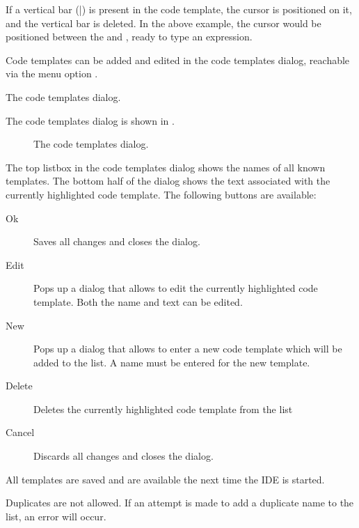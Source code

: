 If a vertical bar (|) is present in the code template, the cursor is positioned
on it, and the vertical bar is deleted. In the above example, the cursor would be
positioned between the  and , ready to type an expression.

Code templates can be added and edited in the code templates dialog, reachable via
the menu option . 

\begin{htmlonly}
The code templates dialog.
\end{htmlonly}
\begin{latexonly}
The code templates dialog is shown in .
\begin{figure}[ht]
\begin{center}
\caption{The code templates dialog.}\label{fig:codetemp}
\ifpdf
{}
\else
{}
\fi
\end{center}
\end{figure}
\end{latexonly}
The top listbox in the code templates dialog shows the names of all 
known templates. The bottom half of the dialog shows the text associated
with the currently highlighted code template.
The following buttons are available:
\begin{description}
\item[Ok] Saves all changes and closes the dialog.
\item[Edit] Pops up a dialog that allows to edit the currently 
highlighted code template. Both the name and text can be edited.
\item[New] Pops up a dialog that allows to enter a new code template
which will be added to the list. A name must be entered for the new
template.
\item[Delete] Deletes the currently highlighted code template from the list
\item[Cancel] Discards all changes and closes the dialog.
\end{description}
All templates are saved and are available the next time the IDE is started.
\begin{remark}
Duplicates are not allowed. If an attempt is made to add a duplicate name
to the list, an error will occur.
\end{remark}

